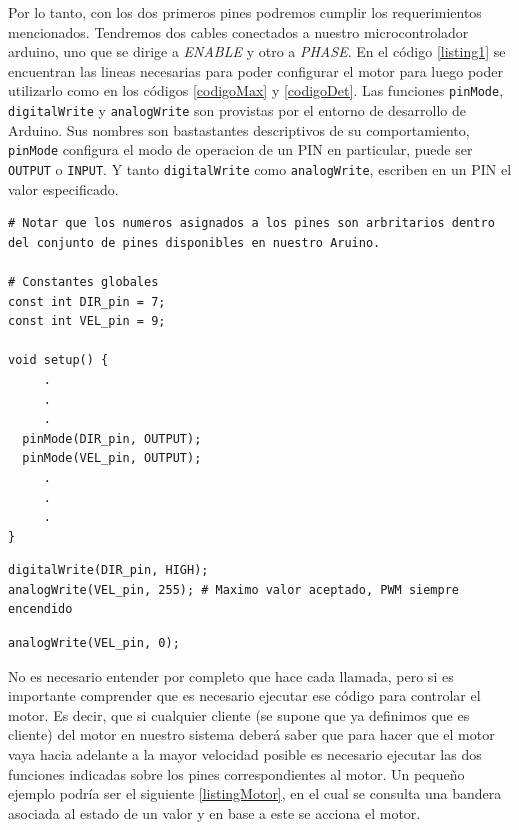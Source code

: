Por lo tanto, con los dos primeros pines podremos cumplir los requerimientos mencionados. Tendremos dos cables conectados a nuestro \gls{microcontrolador} \gls{arduino}, uno que se dirige a \textit{ENABLE} y otro a \textit{PHASE}. En el código \ref{listing1} se encuentran las lineas necesarias para poder configurar el motor para luego poder utilizarlo como en los códigos \ref{codigoMax} y \ref{codigoDet}. Las funciones \verb|pinMode|, \verb|digitalWrite| y \verb|analogWrite| son provistas por el entorno de desarrollo de Arduino. Sus nombres son bastastantes descriptivos de su comportamiento, \verb|pinMode| configura el modo de operacion de un PIN en particular, puede ser \verb|OUTPUT| o \verb|INPUT|. Y tanto \verb|digitalWrite| como \verb|analogWrite|, escriben en un PIN el valor especificado.

\begin{lstlisting}[caption=Configuración inicial,label={listing1}]
# Notar que los numeros asignados a los pines son arbritarios dentro del conjunto de pines disponibles en nuestro Aruino.

# Constantes globales
const int DIR_pin = 7;
const int VEL_pin = 9;

void setup() {
     .
     .
     .
  pinMode(DIR_pin, OUTPUT);
  pinMode(VEL_pin, OUTPUT);
     .
     .
     .
}
\end{lstlisting}

\begin{lstlisting}[caption=Máxima velocidad giro horario,label={codigoMax}]
digitalWrite(DIR_pin, HIGH);
analogWrite(VEL_pin, 255); # Maximo valor aceptado, PWM siempre encendido
\end{lstlisting}

\begin{lstlisting}[caption=Detenerce, label={codigoDet}]
analogWrite(VEL_pin, 0);
\end{lstlisting}

No es necesario entender por completo que hace cada llamada, pero si es importante comprender que es necesario ejecutar ese código para controlar el motor. Es decir, que si cualquier cliente (se supone que ya definimos que es cliente) del motor en nuestro sistema deberá saber que para hacer que el motor vaya hacia adelante a la mayor velocidad posible es necesario ejecutar las dos funciones indicadas sobre los pines correspondientes al motor. Un pequeño ejemplo podría ser el siguiente \ref{listingMotor}, en el cual se consulta una bandera asociada al estado de un valor y en base a este se acciona el motor.

